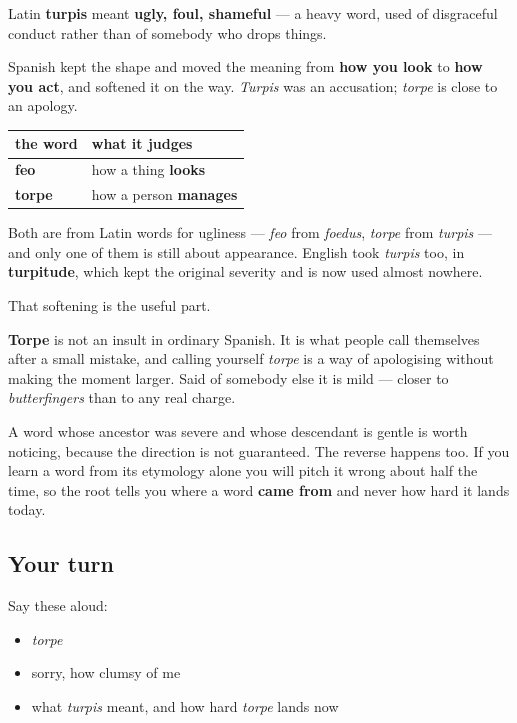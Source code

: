 \begin{cousinweb}
Latin \textbf{turpis} meant \textbf{ugly, foul, shameful} — a heavy word, used of disgraceful conduct rather than of somebody who drops things.

Spanish kept the shape and moved the meaning from \textbf{how you look} to \textbf{how you act}, and softened it on the way. \emph{Turpis} was an accusation; \emph{torpe} is close to an apology.

\noindent
\begin{tabularx}{\linewidth}{@{}>{\raggedright\arraybackslash}X>{\raggedright\arraybackslash}X@{}}
\toprule
\textbf{the word} & \textbf{what it judges} \\
\midrule
\textbf{feo} & how a thing \textbf{looks} \\
\textbf{torpe} & how a person \textbf{manages} \\
\bottomrule
\end{tabularx}

Both are from Latin words for ugliness — \emph{feo} from \emph{foedus}, \emph{torpe} from \emph{turpis} — and only one of them is still about appearance. English took \emph{turpis} too, in \textbf{turpitude}, which kept the original severity and is now used almost nowhere.
\end{cousinweb}

\begin{culture}
That softening is the useful part.

\textbf{Torpe} is not an insult in ordinary Spanish. It is what people call themselves after a small mistake, and calling yourself \emph{torpe} is a way of apologising without making the moment larger. Said of somebody else it is mild — closer to \emph{butterfingers} than to any real charge.

A word whose ancestor was severe and whose descendant is gentle is worth noticing, because the direction is not guaranteed. The reverse happens too. If you learn a word from its etymology alone you will pitch it wrong about half the time, so the root tells you where a word \textbf{came from} and never how hard it lands today.
\end{culture}

\subsection*{Your turn}
Say these aloud:

\begin{itemize}
\raggedright
  \item \emph{torpe}
  \item sorry, how clumsy of me
  \item what \emph{turpis} meant, and how hard \emph{torpe} lands now
\end{itemize}

